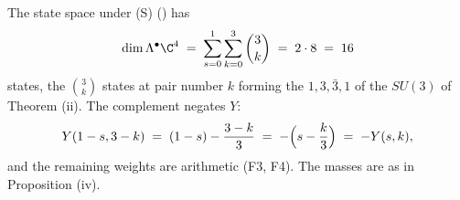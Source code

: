 The state space under (S) () has
\[
\dim \Lambda^{\bullet}\C^{4} \;=\; \sum_{s=0}^{1}\sum_{k=0}^{3}\binom{3}{k} \;=\; 2 \cdot 8 \;=\; 16
\]
states, the $\binom{3}{k}$ states at pair number $k$ forming the $1, 3, \bar{3}, 1$ of the $SU(3)$ of Theorem (ii). The complement negates $Y$:
\[
Y(1 - s, 3 - k) \;=\; (1 - s) - \frac{3 - k}{3} \;=\; -\Bigl(s - \frac{k}{3}\Bigr) \;=\; -Y(s, k),
\]
and the remaining weights are arithmetic (F3, F4). The masses are as in Proposition (iv).
